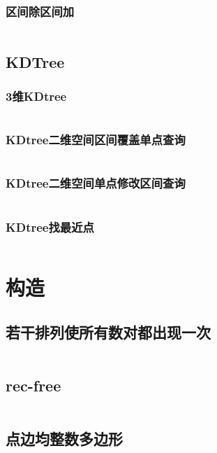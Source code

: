 \documentclass{article}
\begin{document}
\subsubsection{区间除区间加}
\inputminted[breaklines]{c++}{../数据结构/区间除区间加.cpp}

\subsection{KDTree}
\subsubsection{3维KDtree}
\inputminted[breaklines]{c++}{../数据结构/3维KDtree.cpp}

\subsubsection{KDtree二维空间区间覆盖单点查询}
\inputminted[breaklines]{c++}{../数据结构/KDtree二维空间区间覆盖单点查询.cpp}

\subsubsection{KDtree二维空间单点修改区间查询}
\inputminted[breaklines]{c++}{../数据结构/KDtree二维空间单点修改区间查询.cpp}

\subsubsection{KDtree找最近点}
\inputminted[breaklines]{c++}{../数据结构/KDtree找最近点.cpp}

\newpage
\section{构造}
\subsection{若干排列使所有数对都出现一次}
\inputminted[breaklines]{c++}{../构造/若干排列使所有数对都出现一次.cpp}

\subsection{rec-free}
\inputminted[breaklines]{c++}{../构造/rec-free.cpp}

\subsection{点边均整数多边形}
\inputminted[breaklines]{c++}{../构造/点边均整数多边形.cpp}
\end{document}
